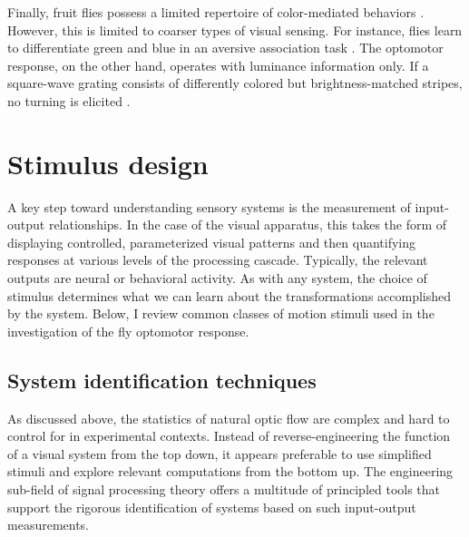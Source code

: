 Finally, fruit flies possess a limited repertoire of color-mediated behaviors \citep{Menne:1977aa}. However, this is limited to coarser types of visual sensing. For instance, flies learn to differentiate green and blue in an aversive association task \citep{Schnaitmann:2013aa}. The optomotor response, on the other hand, operates with luminance information only. If a square-wave grating consists of differently colored but brightness-matched stripes, no turning is elicited \citep{Yamaguchi:2008aa}.

\section{Stimulus design}
A key step toward understanding sensory systems is the measurement of input-output relationships. In the case of the visual apparatus, this takes the form of displaying controlled, parameterized visual patterns and then quantifying responses at various levels of the processing cascade. Typically, the relevant outputs are neural or behavioral activity. As with any system, the choice of stimulus determines what we can learn about the transformations accomplished by the system. Below, I review common classes of motion stimuli used in the investigation of the fly optomotor response.

\subsection{System identification techniques}
As discussed above, the statistics of natural optic flow are complex and hard to control for in experimental contexts. Instead of reverse-engineering the function of a visual system from the top down, it appears preferable to use simplified stimuli and explore relevant computations from the bottom up. The engineering sub-field of signal processing theory offers a multitude of principled tools that support the rigorous identification of systems based on such input-output measurements.

